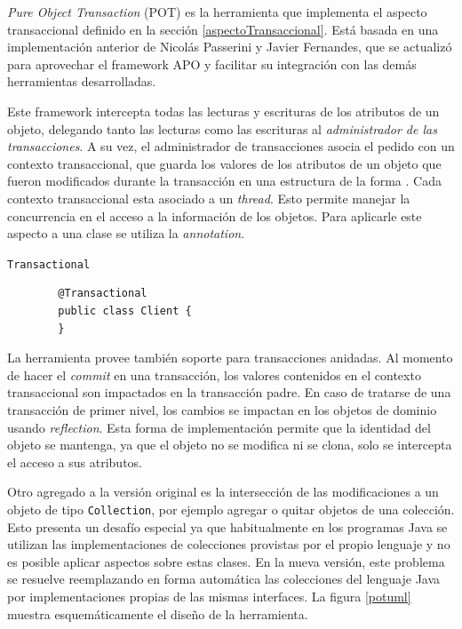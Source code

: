 \emph{Pure Object Transaction} (POT) es la herramienta que implementa el
aspecto transaccional definido en la sección \ref{aspectoTransaccional}.
Está basada en una implementación anterior de Nicolás Passerini y Javier
Fernandes, que se actualizó para aprovechar el framework APO y facilitar su
integración con las demás herramientas desarrolladas.

\medskip
 
Este framework intercepta todas las lecturas y escrituras de los atributos de
un objeto, delegando tanto las lecturas como las escrituras al
\emph{administrador de las transacciones}.
A su vez, el administrador de transacciones asocia el pedido con un contexto
transaccional, que guarda los valores de los atributos de un objeto que fueron
modificados durante la transacción en una estructura de la forma
.
Cada contexto transaccional esta asociado a un \emph{thread}. Esto
permite manejar la concurrencia en el acceso a la información de los objetos.
Para aplicarle este aspecto a una clase se utiliza la \emph{annotation}.

\lstinline|Transactional|
	\begin{lstlisting} 
		@Transactional
		public class Client {
		}
	\end{lstlisting}
	
\medskip
 
La herramienta provee también soporte para transacciones anidadas.
Al momento de hacer el \emph{commit} en una transacción, los valores
contenidos en el contexto transaccional son impactados en la transacción
padre.
En caso de tratarse de una transacción de primer nivel, los cambios se impactan
en los objetos de dominio usando \emph{reflection}.
Esta forma de implementación permite que la identidad del objeto se
mantenga, ya que el objeto no se modifica ni se clona, solo se intercepta el
acceso a sus atributos.

Otro agregado a la versión original es la intersección de las modificaciones 
a un objeto de tipo \lstinline|Collection|, por ejemplo agregar o quitar
objetos de una colección.
Esto presenta un desafío especial ya que habitualmente en los programas Java
se utilizan las implementaciones de colecciones provistas por el propio
lenguaje y no es posible aplicar aspectos sobre estas clases. 
En la nueva versión, este problema se resuelve reemplazando en forma
automática las colecciones del lenguaje Java por
implementaciones propias de las mismas interfaces.
La figura \ref{potuml} muestra esquemáticamente el diseño de la herramienta.

